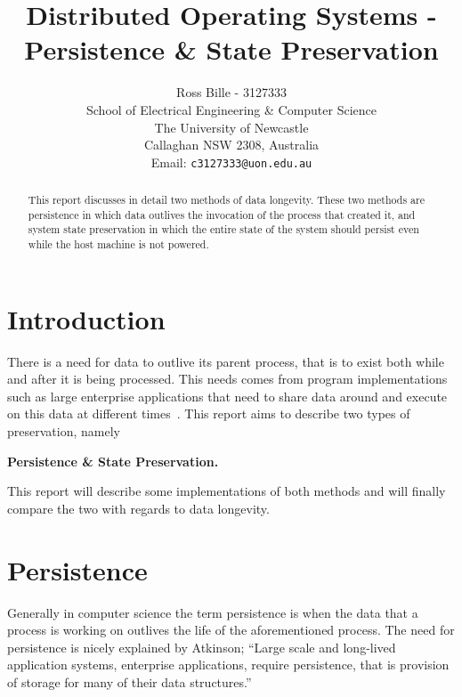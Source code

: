 \documentclass[a4paper,12pt]{article}
\newenvironment{boxit}{\begin{lrbox}{\savepar}
        \begin{minipage}[b]{4.6in}}
        {\end{minipage}\end{lrbox}\fbox{\usebox{\savepar}}}
\begin{document}
%
\title{\bf Distributed Operating Systems - Persistence \& State Preservation}
%
\author{Ross Bille - 3127333\\
School of Electrical Engineering \& Computer Science\\
The University of Newcastle\\ Callaghan NSW 2308, Australia\\
Email: \texttt{c3127333@uon.edu.au} } 

\maketitle


\newpage
\begin{abstract}%
\noindent This report discusses in detail two methods of data longevity. These two methods are persistence in which data outlives the invocation of the process that created it, and system state preservation in which the entire state of the system should persist even while the host machine is not powered.
\end{abstract}

\pagebreak

\tableofcontents

\pagebreak

\section{Introduction}
There is a need for data to outlive its parent process, that is to exist both while and after it is being processed. This needs comes from program implementations such as large enterprise applications that need to share data around and execute on this data at different times~\citep{persistenceandjava}. This report aims to describe two types of preservation, namely 
\begin{center}
    \begin{boxit}
        \begin{center}
            \textbf{Persistence \& State Preservation.}
        \end{center}
    \end{boxit}
\end{center}
This report will describe some implementations of both methods and will finally compare the two with regards to data longevity.
%
\section{Persistence}\label{sec:persistence}
Generally in computer science the term persistence is when the data that a process is working on outlives the life of the aforementioned  process. 
The need for persistence is nicely explained by Atkinson;
``Large scale and long-lived application systems, enterprise applications, require persistence, that is provision of storage for many of their data structures.''~\citep[p.~1]{persistenceandjava}
\end{document}
